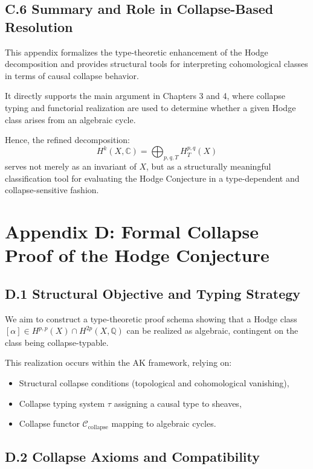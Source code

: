 \documentclass[11pt]{article}
\begin{document}
\subsection*{C.6 Summary and Role in Collapse-Based Resolution}

This appendix formalizes the type-theoretic enhancement of the Hodge decomposition and provides structural tools for interpreting cohomological classes in terms of causal collapse behavior.

It directly supports the main argument in Chapters 3 and 4, where collapse typing and functorial realization are used to determine whether a given Hodge class arises from an algebraic cycle.

Hence, the refined decomposition:
\[
H^k(X, \mathbb{C}) = \bigoplus_{p,q,T} H^{p,q}_T(X)
\]
serves not merely as an invariant of $X$, but as a structurally meaningful classification tool for evaluating the Hodge Conjecture in a type-dependent and collapse-sensitive fashion.



\section*{Appendix D: Formal Collapse Proof of the Hodge Conjecture}

\subsection*{D.1 Structural Objective and Typing Strategy}

We aim to construct a type-theoretic proof schema showing that a Hodge class $[\alpha] \in H^{p,p}(X) \cap H^{2p}(X, \mathbb{Q})$ can be realized as algebraic, contingent on the class being collapse-typable.  

This realization occurs within the AK framework, relying on:

\begin{itemize}
  \item Structural collapse conditions (topological and cohomological vanishing),
  \item Collapse typing system $\tau$ assigning a causal type to sheaves,
  \item Collapse functor $\mathcal{C}_{\text{collapse}}$ mapping to algebraic cycles.
\end{itemize}

\subsection*{D.2 Collapse Axioms and Compatibility}
\end{document}
